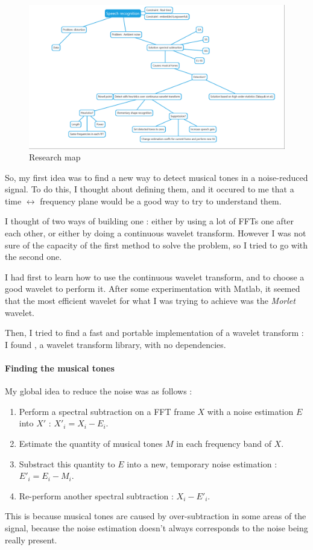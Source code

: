 \begin{figure}[H]
\begin{center}
\includegraphics[scale=0.35]{images/mindmap.png}
\caption{Research map}
\label{diag_api_chords}
\end{center}
\end{figure}

So, my first idea was to find a new way to detect musical tones in a noise-reduced signal.
To do this, I thought about defining them, and it occured to me that a time $\longleftrightarrow$ frequency plane would be a good way to try to understand them.

I thought of two ways of building one : either by using a lot of FFTs one after each other, or either by doing a continuous wavelet transform. However I was not sure of the capacity of the first method to solve the problem, so I tried to go with the second one.

I had first to learn how to use the continuous wavelet transform, and to choose a good wavelet to perform it. After some experimentation with Matlab, it seemed that the most efficient wavelet for what I was trying to achieve was the \textit{Morlet} wavelet. 

Then, I tried to find a fast and portable implementation of a wavelet transform : I found , a  wavelet transform library, with no dependencies.

\paragraph{Finding the musical tones}
My global idea to reduce the noise was as follows : 
\begin{enumerate}
\item Perform a spectral subtraction on a FFT frame $X$ with a noise estimation $E$ into $X'$ : $X'_i = X_i - E_i$.
\item Estimate the quantity of musical tones $M$ in each frequency band of $X$.
\item Substract this quantity to $E$ into a new, temporary noise estimation : $E'_i = E_i - M_i$.
\item Re-perform another spectral subtraction : $X_i - E'_i$.
\end{enumerate}
This is because musical tones are caused by over-subtraction in some areas of the signal, because the noise estimation doesn't always corresponds to the noise being really present. 

